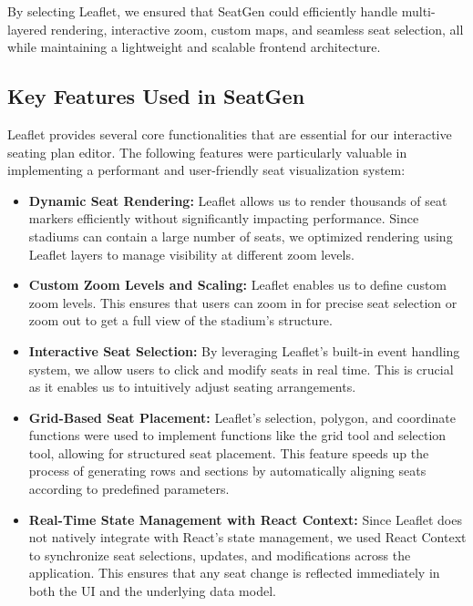 By selecting Leaflet, we ensured that SeatGen could efficiently handle multi-layered rendering, interactive zoom, custom maps, and seamless seat selection, all while maintaining a lightweight and scalable frontend architecture.

\subsection{Key Features Used in SeatGen}

Leaflet provides several core functionalities that are essential for our interactive seating plan editor. The following features were particularly valuable in implementing a performant and user-friendly seat visualization system:

\begin{itemize}
    \item \textbf{Dynamic Seat Rendering:} Leaflet allows us to render thousands of seat markers efficiently without significantly impacting performance. Since stadiums can contain a large number of seats, we optimized rendering using Leaflet layers to manage visibility at different zoom levels.
    \item \textbf{Custom Zoom Levels and Scaling:} Leaflet enables us to define custom zoom levels. This ensures that users can zoom in for precise seat selection or zoom out to get a full view of the stadium’s structure.
    \item \textbf{Interactive Seat Selection:} By leveraging Leaflet’s built-in event handling system, we allow users to click and modify seats in real time. This is crucial as it enables us to intuitively adjust seating arrangements.
    \item \textbf{Grid-Based Seat Placement:} Leaflet’s selection, polygon, and coordinate functions were used to implement functions like the grid tool and selection tool, allowing for structured seat placement. This feature speeds up the process of generating rows and sections by automatically aligning seats according to predefined parameters.
    \item \textbf{Real-Time State Management with React Context:} Since Leaflet does not natively integrate with React’s state management, we used React Context to synchronize seat selections, updates, and modifications across the application. This ensures that any seat change is reflected immediately in both the UI and the underlying data model.
\end{itemize}

